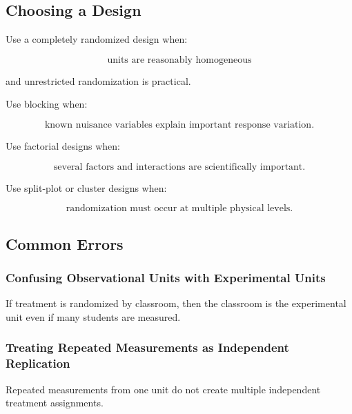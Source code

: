 \subsection{Choosing a Design}
\label{subsec:choosing-experimental-design}

Use a completely randomized design when:

\[
\boxed{
\text{units are reasonably homogeneous}
}
\]

and unrestricted randomization is practical.

Use blocking when:

\[
\boxed{
\text{known nuisance variables explain important response variation}.
}
\]

Use factorial designs when:

\[
\boxed{
\text{several factors and interactions are scientifically important}.
}
\]

Use split-plot or cluster designs when:

\[
\boxed{
\text{randomization must occur at multiple physical levels}.
}
\]

\subsection{Common Errors}
\label{subsec:experimental-design-common-errors}

\subsubsection{Confusing Observational Units with Experimental Units}

If treatment is randomized by classroom, then the classroom is the
experimental unit even if many students are measured.

\subsubsection{Treating Repeated Measurements as Independent Replication}

Repeated measurements from one unit do not create multiple independent
treatment assignments.

